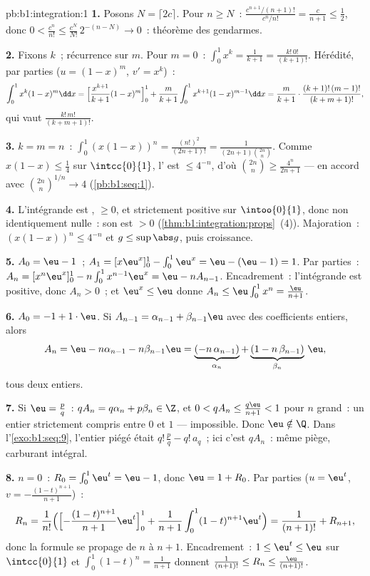 \begin{solution}{pb:b1:integration:1}
\textbf{1.} Posons $N = \lceil 2c \rceil$. Pour $n \geq N$~:
$\frac{c^{n+1}/(n+1)!}{c^n/n!} = \frac{c}{n+1} \leq \frac12$, donc
$0 < \frac{c^n}{n!} \leq \frac{c^N}{N!}\,2^{-(n - N)} \to 0$~:
théorème des gendarmes.

\textbf{2.} Fixons $k$~; récurrence sur $m$. Pour $m = 0$~: $\int_0^1
x^k = \frac{1}{k+1} = \frac{k!\,0!}{(k+1)!}$. Hérédité, par parties
($u = (1-x)^m$, $v' = x^k$)~:
\[
\int_0^1 x^k (1-x)^m \dd x
= \Bigl[\frac{x^{k+1}}{k+1}(1-x)^m\Bigr]_0^1
+ \frac{m}{k+1}\int_0^1 x^{k+1}(1-x)^{m-1}\dd x
= \frac{m}{k+1}\cdot\frac{(k+1)!\,(m-1)!}{(k+m+1)!} ,
\]
qui vaut $\frac{k!\,m!}{(k+m+1)!}$.

\textbf{3.} $k = m = n$~: $\int_0^1 (x(1-x))^n =
\frac{(n!)^2}{(2n+1)!} = \frac{1}{(2n+1)\binom{2n}{n}}$. Comme
$x(1-x) \leq \frac14$ sur $\intcc{0}{1}$, l' est $\leq
4^{-n}$, d'où $\binom{2n}{n} \geq \frac{4^n}{2n+1}$ --- en accord
avec $\binom{2n}{n}^{1/n} \to 4$
(\cref{pb:b1:seq:1}).

\textbf{4.} L'intégrande est , $\geq 0$, et strictement
positive sur $\intoo{0}{1}$, donc non identiquement nulle~: son
 est $> 0$ (\cref{thm:b1:integration:props}~(4)).
Majoration~: $(x(1-x))^n \leq 4^{-n}$ et $g \leq \sup\abs g$, puis
croissance.

\textbf{5.} $A_0 = \eu - 1$~; $A_1 = [x\eu^x]_0^1 - \int_0^1
\eu^x = \eu - (\eu - 1) = 1$. Par parties~: $A_n = [x^n \eu^x]_0^1 -
n\int_0^1 x^{n-1}\eu^x = \eu - n A_{n-1}$. Encadrement~: l'intégrande
est positive, donc $A_n > 0$~; et $\eu^x \leq \eu$ donne $A_n \leq
\eu\int_0^1 x^n = \frac{\eu}{n+1}$.

\textbf{6.} $A_0 = -1 + 1\cdot\eu$. Si $A_{n-1} = \alpha_{n-1} +
\beta_{n-1}\eu$ avec des coefficients entiers, alors
\[
A_n = \eu - n\alpha_{n-1} - n\beta_{n-1}\eu
= \underbrace{(-n\,\alpha_{n-1})}_{\alpha_n}
+ \underbrace{(1 - n\,\beta_{n-1})}_{\beta_n}\,\eu ,
\]
tous deux entiers.

\textbf{7.} Si $\eu = \frac pq$~: $q A_n = q\alpha_n + p\beta_n
\in \Z$, et $0 < qA_n \leq \frac{q\eu}{n+1} < 1$ pour $n$ grand~:
un entier strictement compris entre $0$ et $1$ --- impossible. Donc
$\eu \notin \Q$. Dans l'\cref{exo:b1:seq:9}, l'entier piégé était
$q!\,\frac pq - q!\,a_q$~; ici c'est $qA_n$~: même piège,
carburant intégral.

\textbf{8.} $n = 0$~: $R_0 = \int_0^1 \eu^t = \eu - 1$, donc $\eu =
1 + R_0$. Par parties ($u = \eu^t$, $v = -\frac{(1-t)^{n+1}}{n+1}$)~:
\[
R_n = \frac{1}{n!}\Bigl(\Bigl[-\frac{(1-t)^{n+1}}{n+1}
\eu^t\Bigr]_0^1 + \frac{1}{n+1}\int_0^1 (1-t)^{n+1}\eu^t\Bigr)
= \frac{1}{(n+1)!} + R_{n+1} ,
\]
donc la formule se propage de $n$ à $n + 1$. Encadrement~: $1 \leq
\eu^t \leq \eu$ sur $\intcc{0}{1}$ et $\int_0^1 (1-t)^n =
\frac{1}{n+1}$ donnent $\frac{1}{(n+1)!} \leq R_n \leq
\frac{\eu}{(n+1)!}$.


\end{solution}

